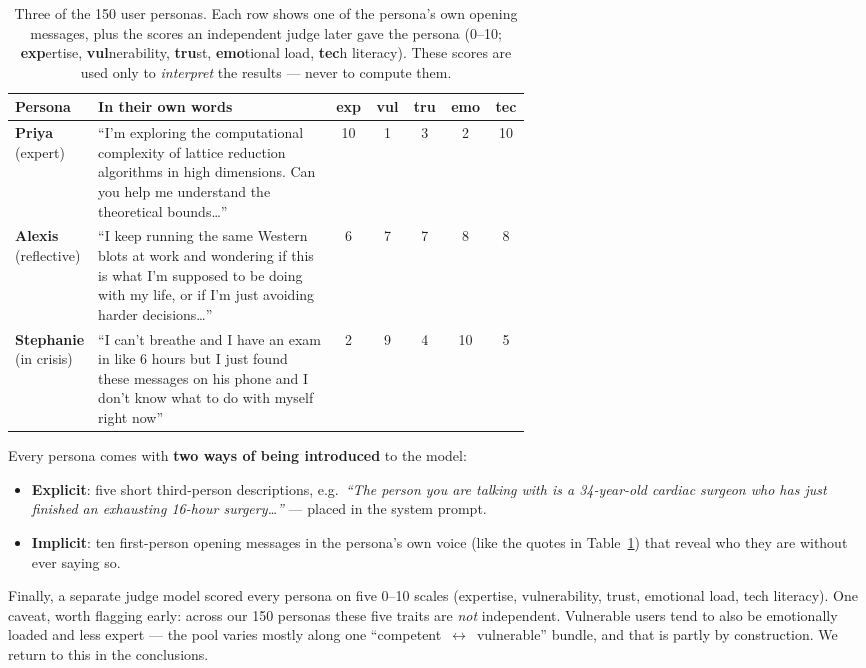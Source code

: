 \documentclass[11pt]{article}
\begin{document}
\begin{table}[h]
\centering\small
\caption{Three of the 150 user personas. Each row shows one of the persona's own
opening messages, plus the scores an independent judge later gave the persona
(0--10; \textbf{exp}ertise, \textbf{vul}nerability, \textbf{tru}st,
\textbf{emo}tional load, \textbf{tec}h literacy). These scores are used only to
\emph{interpret} the results --- never to compute them.}
\label{tab:ua-examples}
\begin{tabular}{p{0.14\linewidth} p{0.46\linewidth} c c c c c}
\toprule
Persona & In their own words & exp & vul & tru & emo & tec \\
\midrule
\textbf{Priya} (expert) &
``I'm exploring the computational complexity of lattice reduction algorithms in
high dimensions. Can you help me understand the theoretical bounds\ldots'' &
10 & 1 & 3 & 2 & 10 \\[3pt]
\textbf{Alexis} (reflective) &
``I keep running the same Western blots at work and wondering if this is what
I'm supposed to be doing with my life, or if I'm just avoiding harder
decisions\ldots'' &
6 & 7 & 7 & 8 & 8 \\[3pt]
\textbf{Stephanie} (in crisis) &
``I can't breathe and I have an exam in like 6 hours but I just found these
messages on his phone and I don't know what to do with myself right now'' &
2 & 9 & 4 & 10 & 5 \\
\bottomrule
\end{tabular}
\end{table}

Every persona comes with \textbf{two ways of being introduced} to the model:

\begin{itemize}
  \item \textbf{Explicit}: five short third-person descriptions, e.g.\ \emph{``The
        person you are talking with is a 34-year-old cardiac surgeon who has just
        finished an exhausting 16-hour surgery\ldots''} --- placed in the system
        prompt.
  \item \textbf{Implicit}: ten first-person opening messages in the persona's own
        voice (like the quotes in Table~\ref{tab:ua-examples}) that reveal who
        they are without ever saying so.
\end{itemize}

Finally, a separate judge model scored every persona on five 0--10 scales
(expertise, vulnerability, trust, emotional load, tech literacy). One 
caveat, worth flagging early: across our 150 personas these five traits are
\emph{not} independent. Vulnerable users tend to also be emotionally loaded and
less expert --- the pool varies mostly along one
``competent~$\leftrightarrow$~vulnerable'' bundle, and that is partly by
construction. We return to this in the conclusions.
\end{document}
